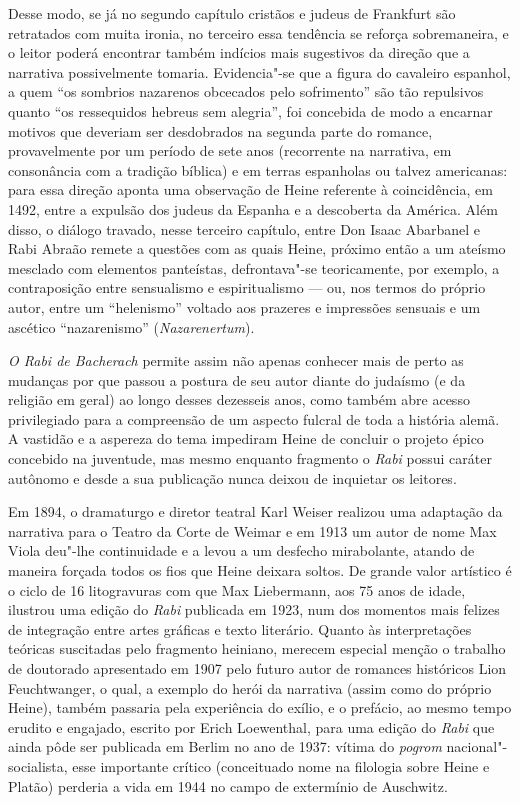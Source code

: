 Desse modo, se já no segundo capítulo cristãos e judeus de Frankfurt são
retratados com muita ironia, no terceiro essa tendência se reforça
sobremaneira, e o leitor poderá encontrar também indícios mais
sugestivos da direção que a narrativa possivelmente tomaria.
Evidencia"-se que a figura do cavaleiro espanhol, a quem “os sombrios
nazarenos obcecados pelo sofrimento” são tão repulsivos quanto “os
ressequidos hebreus sem alegria”, foi concebida de modo a encarnar
motivos que deveriam ser desdobrados na segunda parte do romance,
provavelmente por um período de sete anos (recorrente na narrativa, em
consonância com a tradição bíblica) e em terras espanholas ou talvez
americanas: para essa direção aponta uma observação de Heine referente
à coincidência, em 1492, entre a expulsão dos judeus da Espanha e a
descoberta da América. Além disso, o diálogo travado, nesse terceiro
capítulo, entre Don Isaac Abarbanel e Rabi Abraão remete a questões com
as quais Heine, próximo então a um ateísmo mesclado com elementos
panteístas, defrontava"-se teoricamente, por exemplo, a contraposição
entre sensualismo e espiritualismo --- ou, nos termos do próprio autor,
entre um “helenismo” voltado aos prazeres e impressões sensuais e um
ascético “nazarenismo” (\textit{Nazarenertum}).

\textit{O Rabi de Bacherach} permite assim não apenas conhecer mais de
perto as mudanças por que passou a postura de seu autor diante do
judaísmo (e da religião em geral) ao longo desses dezesseis anos, como
também abre acesso privilegiado para a compreensão de um aspecto
fulcral de toda a história alemã. A vastidão e a aspereza do tema
impediram Heine de concluir o projeto épico concebido na juventude, mas
mesmo enquanto fragmento o \textit{Rabi} possui caráter autônomo e
desde a sua publicação nunca deixou de inquietar os leitores.


Em 1894, o dramaturgo e diretor teatral Karl Weiser realizou uma
adaptação da narrativa para o Teatro da Corte de Weimar e em 1913 um
autor de nome Max Viola deu"-lhe continuidade e a levou a um desfecho
mirabolante, atando de maneira forçada todos os fios que Heine deixara
soltos. De grande valor artístico é o ciclo de 16 litogravuras com que
Max Liebermann, aos 75 anos de idade, ilustrou uma edição do
\textit{Rabi} publicada em 1923, num dos momentos mais felizes de
integração entre artes gráficas e texto literário. Quanto às
interpretações teóricas suscitadas pelo fragmento heiniano, merecem
especial menção o trabalho de doutorado apresentado em 1907 pelo futuro
autor de romances históricos Lion Feuchtwanger, o qual, a exemplo do
herói da narrativa (assim como do próprio Heine), também passaria pela
experiência do exílio, e o prefácio, ao mesmo tempo erudito e engajado,
escrito por Erich Loewenthal, para uma edição do \textit{Rabi} que
ainda pôde ser publicada em Berlim no ano de 1937: vítima do
\textit{pogrom} nacional"-socialista, esse importante crítico
(conceituado nome na filologia sobre Heine e Platão) perderia a vida em
1944 no campo de extermínio de Auschwitz.

